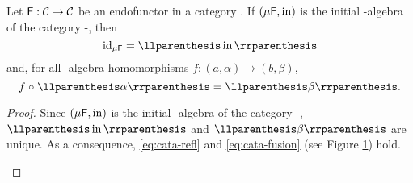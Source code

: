 \begin{lemma}%
  \label{lem:cata-refl-fusion}


  Let $\mathsf{F}: \mathcal{C} \to \mathcal{C}$ be an endofunctor in a category
  . If $(\mu\mathsf{F},\operatorname{in})$ is the initial -algebra of
  the category -\alg, then
  \begin{equation}
    \label{eq:cata-refl}
    \idO{\mu\func{F}} = \cata\inmo
  \end{equation}
  and, for all -algebra homomorphisms $f: (a,\alpha) \to
  (b,\beta)$,
  \begin{equation}
    \label{eq:cata-fusion}
    f \comp \cata\alpha = \cata\beta
    \text{.}
  \end{equation}

  \begin{proof}

    Since $(\mu\mathsf{F},\operatorname{in})$ is the initial -algebra of the
    category -\alg, $\cata\inmo$ and $\cata\beta$ are unique.
    As a consequence, \eqref{eq:cata-refl} and \eqref{eq:cata-fusion}
    (see Figure \ref{fig:cata-fusion}) hold.
    \begin{figure}[htbp]
      \begin{center}
      \end{center}
      \caption{}
      \label{fig:cata-fusion}
    \end{figure}

  \end{proof}

\end{lemma}

